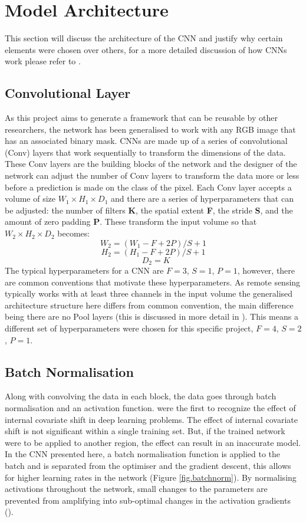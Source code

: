 \section{Model Architecture}\label{sec.model_architecture}
This section will discuss the architecture of the CNN and justify why certain elements were chosen over others, for a more detailed discussion of how CNNs work please refer to \cite{Richmond19b}.
\subsection{Convolutional Layer}
As this project aims to generate a framework that can be reusable by other researchers, the network has been generalised to work with any RGB image that has an associated binary mask. CNNs are made up of a series of convolutional (Conv) layers that work sequentially to transform the dimensions of the data. These Conv layers are the building blocks of the network and the designer of the network can adjust the number of Conv layers to transform the data more or less before a prediction is made on the class of the pixel. Each Conv layer accepts a volume of size\textbf{ $W_1\times H_1\times D_1$} and there are a series of hyperparameters that can be adjusted: the number of filters \textbf{K}, the spatial extent \textbf{F}, the stride \textbf{S}, and the amount of zero padding \textbf{P}. These transform the input volume so that \textbf{$W_2\times H_2\times D_2$} becomes: 
\[\textbf{$W_2 = (W_1 - F + 2P)/S + 1$}\] \[\textbf{$H_2 = (H_1 - F + 2P)/S + 1$}\]\[\textbf{ $D_2 = K$}\]
The typical hyperparameters for a CNN are $F = 3$, $S = 1$, $P = 1$, however, there are common conventions that motivate these hyperparameters. As remote sensing typically works with at least three channels in the input volume the generalised architecture structure here differs from common convention, the main difference being there are no Pool layers (this is discussed in more detail in \citet{Richmond19b}). This means a different set of hyperparameters were chosen for this specific project, $F = 4$, $S = 2$, $P = 1$. 
\subsection{Batch Normalisation}
Along with convolving the data in each block, the data goes through batch normalisation and an activation function. \citet{ioffe15} were the first to recognize the effect of internal covariate shift in deep learning problems. The effect of internal covariate shift is not significant within a single training set. But, if the trained network were to be applied to another region, the effect can result in an inaccurate model. In the CNN presented here, a batch normalisation function is applied to the batch and is separated from the optimiser and the gradient descent, this allows for higher learning rates in the network (Figure \ref{fig.batchnorm}). By normalising activations throughout the network, small changes to the parameters are prevented from amplifying into sub-optimal changes in the activation gradients (\cite{ioffe15}). 

